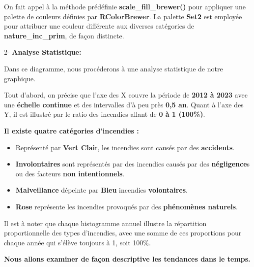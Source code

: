 \documentclass[
]{article}
\begin{document}
On fait appel à la méthode prédéfinie \textbf{scale\_fill\_brewer()}
pour appliquer une palette de couleurs définies par
\textbf{RColorBrewer}. La palette \textbf{Set2} est employée pour
attribuer une couleur différente aux diverses catégories de
\textbf{nature\_inc\_prim}, de façon distincte.

2- \textbf{Analyse Statistique:}

Dans ce diagramme, nous procéderons à une analyse statistique de notre
graphique.

Tout d'abord, on précise que l'axe des X couvre la période de
\textbf{2012 à 2023} avec une \textbf{échelle continue} et des
intervalles d'à peu près \textbf{0,5 an}. Quant à l'axe des Y, il est
illustré par le ratio des incendies allant de \textbf{0 à 1 (100\%)}.

\textbf{Il existe quatre catégories d'incendies :}

\begin{itemize}
\item
  Représenté par \textbf{Vert Clai}r, les incendies sont causés par des
  \textbf{accidents}.
\item
  \textbf{Involontaires} sont représentés par des incendies causés par
  des \textbf{négligence}s ou des facteurs \textbf{non intentionnels}.
\item
  \textbf{Malveillance} dépeinte par \textbf{Bleu} incendies
  \textbf{volontaires}.
\item
  \textbf{Rose} représente les incendies provoqués par des
  \textbf{phénomènes naturels}.
\end{itemize}

Il est à noter que chaque histogramme annuel illustre la répartition
proportionnelle des types d'incendies, avec une somme de ces proportions
pour chaque année qui s'élève toujours à 1, soit 100\%.

\textbf{Nous allons examiner de façon descriptive les tendances dans le
temps.}
\end{document}
